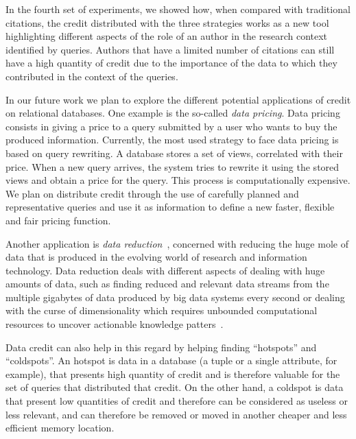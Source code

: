In the fourth set of experiments, we showed how, when compared with traditional citations, the credit distributed with the three strategies works as a new tool highlighting different aspects of the role of an author in the research context identified by queries. Authors that have a limited number of citations can still have a high quantity of credit due to the importance of the data to which they contributed in the context of the queries. 

In our future work we plan to explore the different potential applications of credit on relational databases.
One example is the so-called \emph{data pricing}. Data pricing consists in giving a price to a query submitted by a user who wants to buy the produced information. Currently, the most used strategy to face data pricing is based on query rewriting. A database stores a set of views, correlated with their price. When a new query arrives, the system tries to rewrite it using the stored views and obtain a price for the query. This process is computationally expensive.
We plan on distribute credit through the use of carefully planned and representative queries and use it as information to define a new faster, flexible and fair pricing function.

Another application is \emph{data reduction}~\cite{milo2019getting}, concerned with reducing the huge mole of data that is produced in the evolving world of research and information technology. Data reduction deals with different aspects of dealing with huge amounts of data, such as finding reduced and relevant data streams from the multiple gigabytes of data produced by big data systems every second or dealing with the curse of dimensionality which requires unbounded computational resources to uncover actionable knowledge patters~\citep{ur2016big}.

Data credit can also help in this regard by helping finding ``hotspots'' and ``coldspots''. An hotspot is data in a database (a tuple or a single attribute, for example), that presents high quantity of credit and is therefore valuable for the set of queries that distributed that credit. 
On the other hand, a coldspot is data that present low quantities of credit and therefore can be considered as useless or less relevant, and can therefore be removed or moved in another cheaper and less efficient memory location. 
